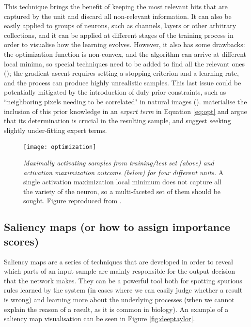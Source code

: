This technique brings the benefit of keeping the most relevant bits that are captured by the unit and discard all non-relevant information. It can also be easily applied to groups of neurons, such as channels, layers or other arbitrary collections, and it can be applied at different stages of the training process in order to visualise how the learning evolves. However, it also has some drawbacks: the optimization function is non-convex, and the algorithm can arrive at different local minima, so special techniques need to be added to find all the relevant ones (\cite{Nguyen2016,Olah2017}); the gradient ascent requires setting a stopping criterion and a learning rate, and the process can produce highly unrealistic samples. This last issue could be potentially mitigated by the introduction of duly prior constraints, such as ``neighboring pixels needing to be correlated" in natural images (\cite{Mordvintsev2015}). \cite{Montavon2018} materialise the inclusion of this prior knowledge in an \textit{expert term} in Equation \ref{eq:opt} and argue that its determination is crucial in the resulting sample, and suggest seeking slightly under-fitting expert terms.    
\begin{figure}
	\centering
	\texttt{[image: optimization]}
	\caption{\textit{Maximally activating samples from training/test set (above) and activation maximization outcome (below) for four different units.} A single activation maximization local minimum does not capture all the variety of the neuron, so a multi-faceted set of them should be sought. Figure reproduced from \cite{Olah2017}.}
	\label{optimization}
\end{figure}


\subsection{Saliency maps (or how to assign importance scores)}

Saliency maps are a series of techniques that are developed in order to reveal which parts of an input sample are mainly responsible for the output decision that the network makes. They can be a powerful tool both for spotting spurious rules learned by the system (in cases where we can easily judge whether a result is wrong) and learning more about the underlying processes (when we cannot explain the reason of a result, as it is common in biology). An example of a saliency map visualisation can be seen in Figure \ref{fig:deeptaylor}.

